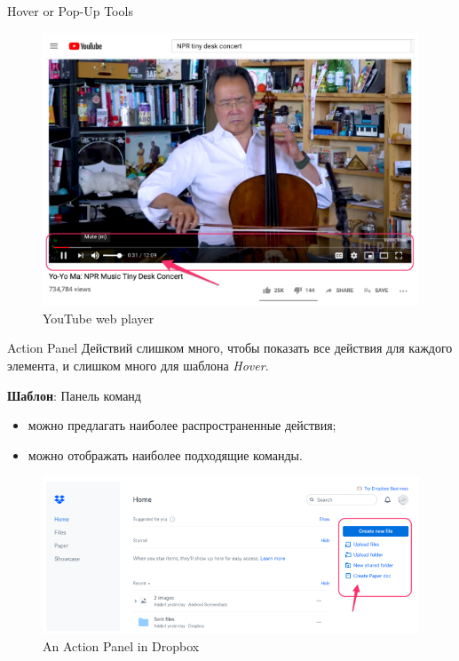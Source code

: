 \documentclass{beamer}
\begin{document}
\begin{frame}[t]{Hover or Pop-Up Tools}
	\begin{figure}[h]
		\centering
		\includegraphics[scale=0.6]{images/lec08-pic05.png}
		\caption{YouTube web player}
	\end{figure}
\end{frame}

\begin{frame}[t]{Action Panel}
	Действий слишком много, чтобы показать все действия для каждого элемента, и слишком много для шаблона \textit{Hover}.

	\textbf{Шаблон}: Панель команд
		\begin{itemize}
		\item можно предлагать наиболее распространенные действия;
		\item можно отображать наиболее подходящие команды.
	\end{itemize}
	
	\begin{figure}[h]
		\centering
		\includegraphics[scale=0.5]{images/lec08-pic06.png}
		\caption{An Action Panel in Dropbox}
	\end{figure}
\end{frame}
\end{document}
